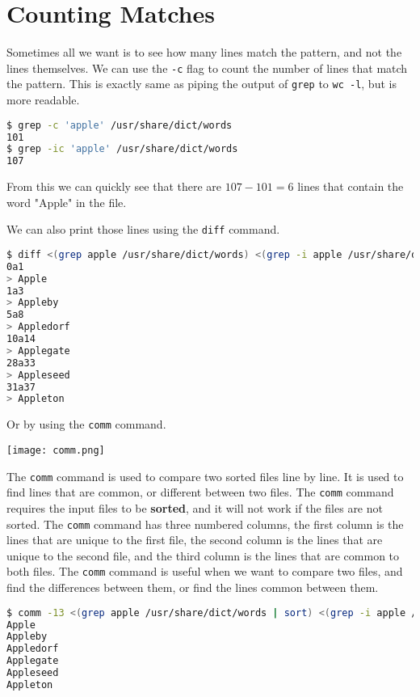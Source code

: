 \section{Counting Matches}

Sometimes all we want is to see how many lines match the pattern, and not the lines themselves. We can use the \lstinline|-c| flag to count the number of lines that match the pattern.
This is exactly same as piping the output of \lstinline|grep| to \lstinline|wc -l|, but is more readable.

\begin{lstlisting}[language=bash]
$ grep -c 'apple' /usr/share/dict/words
101
$ grep -ic 'apple' /usr/share/dict/words
107
\end{lstlisting}

From this we can quickly see that there are $107-101=6$ lines that
contain the word "Apple" in the file.

We can also print those lines using the \lstinline|diff| command.

\begin{lstlisting}[language=bash]
$ diff <(grep apple /usr/share/dict/words) <(grep -i apple /usr/share/dict/words)
0a1
> Apple
1a3
> Appleby
5a8
> Appledorf
10a14
> Applegate
28a33
> Appleseed
31a37
> Appleton
\end{lstlisting}

Or by using the \lstinline|comm| command.

\begin{marginfigure}
  \texttt{[image: comm.png]}
  \caption{The \lstinline|comm| command}
\end{marginfigure}

The \lstinline|comm| command is used to compare two sorted files line by line. It is used to find lines that are common, or different between two files. The \lstinline|comm| command requires the input files to be \textbf{sorted}, and it will not work if the files are not sorted. The \lstinline|comm| command has three numbered columns, the first column is the lines that are unique to the first file, the second column is the lines that are unique to the second file, and the third column is the lines that are common to both files. The \lstinline|comm| command is useful when we want to compare two files, and find the differences between them, or find the lines common between them.
\begin{lstlisting}[language=bash]
$ comm -13 <(grep apple /usr/share/dict/words | sort) <(grep -i apple /usr/share/dict/words | sort)
Apple
Appleby
Appledorf
Applegate
Appleseed
Appleton
\end{lstlisting}

